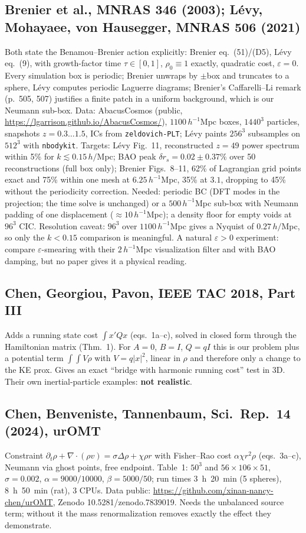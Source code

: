 \documentclass[11pt]{article}
\newcommand{\eps}{\varepsilon}
\newcommand{\code}[1]{\texttt{#1}}
\newcommand{\dv}{\nabla\cdot}
\newcommand{\no}{\textcolor{BrickRed}{\textbf{not realistic}}}
\begin{document}
\subsection{Brenier et al., MNRAS 346 (2003); L\'evy, Mohayaee, von Hausegger, MNRAS 506 (2021)}
Both state the Benamou--Brenier action explicitly: Brenier eq.~(51)/(D5), L\'evy eq.~(9), with growth-factor time $\tau\in[0,1]$, $\rho_0\equiv1$ exactly, quadratic cost, $\eps=0$. Every simulation box is periodic; Brenier unwraps by $\pm$box and truncates to a sphere, L\'evy computes periodic Laguerre diagrams; Brenier's Caffarelli--Li remark (p.~505, 507) justifies a finite patch in a uniform background, which is our Neumann sub-box. Data: AbacusCosmos (public, \url{https://lgarrison.github.io/AbacusCosmos/}), $1100\,h^{-1}$Mpc boxes, $1440^3$ particles, snapshots $z=0.3\ldots1.5$, ICs from \code{zeldovich-PLT}; L\'evy paints $256^3$ subsamples on $512^3$ with \code{nbodykit}. Targets: L\'evy Fig.~11, reconstructed $z=49$ power spectrum within 5\% for $k\lesssim0.15\,h/$Mpc; BAO peak $\delta r_s=0.02\pm0.37\%$ over 50 reconstructions (full box only); Brenier Figs.~8--11, 62\% of Lagrangian grid points exact and 75\% within one mesh at $6.25\,h^{-1}$Mpc, 35\% at $3.1$, dropping to 45\% without the periodicity correction. Needed: periodic BC (DFT modes in the projection; the time solve is unchanged) or a $500\,h^{-1}$Mpc sub-box with Neumann padding of one displacement ($\approx10\,h^{-1}$Mpc); a density floor for empty voids at $96^3$ CIC. Resolution caveat: $96^3$ over $1100\,h^{-1}$Mpc gives a Nyquist of $0.27\,h/$Mpc, so only the $k<0.15$ comparison is meaningful. A natural $\eps>0$ experiment: compare $\eps$-smearing with their $2\,h^{-1}$Mpc visualization filter and with BAO damping, but no paper gives it a physical reading.

\subsection{Chen, Georgiou, Pavon, IEEE TAC 2018, Part III}
Adds a running state cost $\int x'Qx$ (eqs.~1a--c), solved in closed form through the Hamiltonian matrix (Thm.~1). For $A=0$, $B=I$, $Q=qI$ this is our problem plus a potential term $\int\!\int V\rho$ with $V=q|x|^2$, linear in $\rho$ and therefore only a change to the KE prox. Gives an exact ``bridge with harmonic running cost'' test in 3D. Their own inertial-particle examples: \no.

\subsection{Chen, Benveniste, Tannenbaum, Sci.\ Rep.\ 14 (2024), urOMT}
Constraint $\partial_t\rho+\dv(\rho v)=\sigma\Delta\rho+\chi\rho r$ with Fisher--Rao cost $\alpha\chi r^2\rho$ (eqs.~3a--c), Neumann via ghost points, free endpoint. Table~1: $50^3$ and $56\times106\times51$, $\sigma=0.002$, $\alpha=9000/10000$, $\beta=5000/50$; run times 3~h~20~min (5 spheres), 8~h~50~min (rat), 3 CPUs. Data public: \url{https://github.com/xinan-nancy-chen/urOMT}, Zenodo 10.5281/zenodo.7839019. Needs the unbalanced source term; without it the mass renormalization removes exactly the effect they demonstrate.
\end{document}
